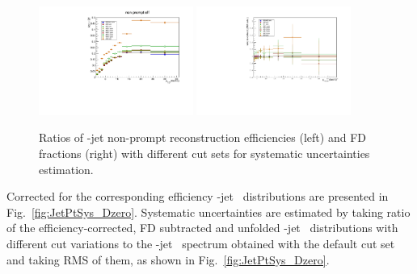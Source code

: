 \begin{figure}[bth]
\begin{center}
\includegraphics[width=0.45\textwidth]{pPbcuts_2sig/cutSys2/cutSys_nonprompt}
\includegraphics[width=0.45\textwidth]{pPbcuts_2sig/cutSys2/cutSys_FDr_D3}
\caption{Ratios of \Dzero-jet non-prompt reconstruction efficiencies (left) and FD fractions (right) with different cut sets for systematic uncertainties estimation.} 
\label{fig:JetcutVarFD_Dzero}
\end{center}
\end{figure} 

Corrected for the corresponding efficiency \Dzero-jet \ptchjet\ distributions are presented in Fig.~\ref{fig:JetPtSys_Dzero}. Systematic uncertainties are estimated by taking ratio of the efficiency-corrected, FD subtracted and unfolded \Dzero-jet \ptchjet\ distributions with different cut variations to the \Dzero-jet \pt\ spectrum obtained with the default cut set and taking RMS of them, as shown in Fig.~\ref{fig:JetPtSys_Dzero}.


